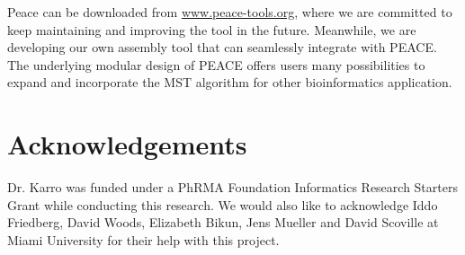 \documentclass[a4,center,fleqn]{NAR}
\begin{document}
Peace can be downloaded from
\href{http://www.peace-tools.org}{www.peace-tools.org}, where we are
committed to keep maintaining and improving the tool in the future.
Meanwhile, we are developing our own assembly tool that can seamlessly
integrate with PEACE.  The underlying modular design of PEACE offers
users many possibilities to expand and incorporate the MST algorithm
for other bioinformatics application.

\section{Acknowledgements}

Dr. Karro was funded under a PhRMA Foundation Informatics Research
Starters Grant while conducting this research.  We would also like to
acknowledge Iddo Friedberg, David Woods, Elizabeth Bikun, Jens Mueller and David
Scoville at Miami University for their help with this project.

\vspace{3mm}


\end{document}
